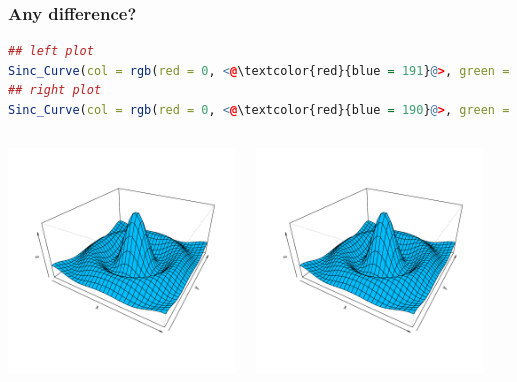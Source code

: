 \documentclass{beamer}
\begin{document}
\begin{frame}[fragile]
\frametitle{Any difference?}
\begin{lstlisting}[language = R]
## left plot
Sinc_Curve(col = rgb(red = 0, <@\textcolor{red}{blue = 191}@>, green = 255, ...))
## right plot
Sinc_Curve(col = rgb(red = 0, <@\textcolor{red}{blue = 190}@>, green = 255, ...))
\end{lstlisting}

\begin{columns}[c]
\includegraphics[height = 6cm, width = 6cm]{plot/diff_1.pdf}

\includegraphics[height = 6cm, width = 6cm]{plot/diff_2.pdf}

\end{columns}
\end{frame}



\end{document}
